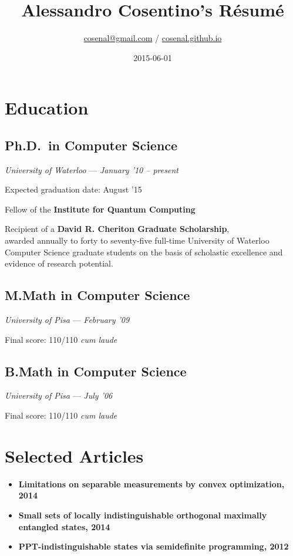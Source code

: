 \documentclass[]{article}
\title{Alessandro Cosentino's Résumé}
\author{\href{mailto:cosenal@gmail.com}{cosenal@gmail.com} / 
  \href{https://cosenal.github.io}{cosenal.github.io}}
\date{2015-06-01}
\begin{document}
\maketitle

\section{Education}\label{education}

\subsection{Ph.D.~in Computer Science}\label{ph.d.in-computer-science}

\emph{University of Waterloo} --- \emph{January '10 -- present}

Expected graduation date: August '15

Fellow of the \textbf{Institute for Quantum Computing}

Recipient of a \textbf{David R. Cheriton Graduate Scholarship},\\awarded
annually to forty to seventy-five full-time University of Waterloo
Computer Science graduate students on the basis of scholastic excellence
and evidence of research potential.

\subsection{M.Math in Computer
Science}\label{m.math-in-computer-science}

\emph{University of Pisa} --- \emph{February '09}

Final score: 110/110 \emph{cum laude}

\subsection{B.Math in Computer
Science}\label{b.math-in-computer-science}

\emph{University of Pisa} --- \emph{July '06}

Final score: 110/110 \emph{cum laude}

\section{Selected Articles}\label{selected-articles}

\begin{itemize}
\itemsep1pt\parskip0pt
\item
  \textbf{Limitations on separable measurements by convex optimization,
  2014}
\item
  \textbf{Small sets of locally indistinguishable orthogonal maximally
  entangled states, 2014}
\item
  \textbf{PPT-indistinguishable states via semidefinite programming,
  2012}
\end{itemize}
\end{document}
